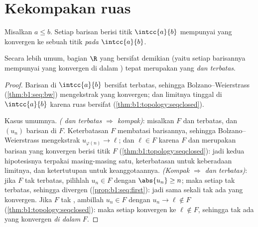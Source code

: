 \section{Kekompakan ruas}

\begin{theorem}\label{thm:b1:topology:compact}
Misalkan $a \leq b$. Setiap barisan berisi titik $\intcc{a}{b}$ mempunyai
 yang konvergen ke sebuah titik \emph{pada}
$\intcc{a}{b}$.

Secara lebih umum,  bagian $\R$ yang bersifat demikian (yaitu setiap
barisannya mempunyai  yang konvergen di dalam ) tepat merupakan
 yang \emph{ dan terbatas}.
\end{theorem}

\begin{proof}
Barisan di $\intcc{a}{b}$ bersifat terbatas, sehingga Bolzano--Weierstrass
(\cref{thm:b1:seq:bw}) mengekstrak  yang konvergen; dan limitnya
tinggal di $\intcc{a}{b}$ karena ruas bersifat 
(\cref{thm:b1:topology:seqclosed}).

Kasus umumnya. \emph{( dan terbatas $\Rightarrow$ kompak)}: misalkan
$F$  dan terbatas, dan $(u_n)$ barisan di $F$.
Keterbatasan $F$ membatasi barisannya, sehingga Bolzano--Weierstrass
mengekstrak $u_{\varphi(n)} \to \ell$; dan $\ell \in F$ karena $F$
 dan  merupakan barisan yang konvergen berisi titik
$F$ (\cref{thm:b1:topology:seqclosed}): jadi kedua hipotesisnya
terpakai masing-masing satu, keterbatasan untuk keberadaan limitnya,
dan ketertutupan untuk keanggotaannya. \emph{(Kompak $\Rightarrow$  dan
terbatas)}: jika $F$ tak terbatas, pilihlah $u_n \in F$ dengan $\abs{u_n} \geq
n$; maka setiap  tak terbatas, sehingga divergen
(\cref{prop:b1:seq:first}): jadi sama sekali tak ada  yang konvergen. Jika $F$
tak , ambillah $u_n \in F$ dengan $u_n \to \ell \notin F$
(\cref{thm:b1:topology:seqclosed}): maka setiap  konvergen ke
$\ell \notin F$, sehingga tak ada  yang konvergen \emph{di dalam} $F$.
\end{proof}

